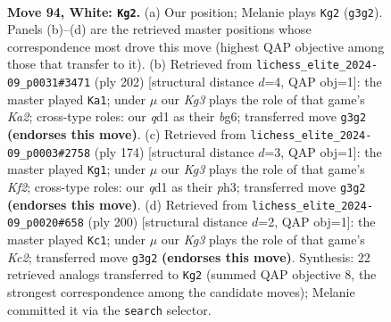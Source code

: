 \documentclass[11pt]{article}
\begin{document}
\clearpage

\begin{figure}[p]\centering
\begin{subfigure}{0.46\textwidth}\centering
\resizebox{\linewidth}{!}{%
\newchessgame
\chessboard[
  setfen={8/8/8/8/2p1k3/6K1/p7/3q4 w - - 0 94},
  showmover=false,
  pgfstyle=straightmove, color=movearrow, markmove={g3-g2}
]}
\caption{}
\end{subfigure}\hfill
\begin{subfigure}{0.46\textwidth}\centering
\resizebox{\linewidth}{!}{%
\newchessgame
\chessboard[
  setfen={8/8/p5b1/8/8/2k5/K7/8 w - - 14 102},
  showmover=false,
  pgfstyle=straightmove, color=movearrow, markmove={a2-a1}
]}
\caption{}
\end{subfigure}
\\[4pt]
\begin{subfigure}{0.46\textwidth}\centering
\resizebox{\linewidth}{!}{%
\newchessgame
\chessboard[
  setfen={8/8/8/7p/5k2/7p/5K2/8 w - - 12 88},
  showmover=false,
  pgfstyle=straightmove, color=movearrow, markmove={f2-g1}
]}
\caption{}
\end{subfigure}\hfill
\begin{subfigure}{0.46\textwidth}\centering
\resizebox{\linewidth}{!}{%
\newchessgame
\chessboard[
  setfen={8/8/8/7p/1q6/4k3/2K5/8 w - - 4 101},
  showmover=false,
  pgfstyle=straightmove, color=movearrow, markmove={c2-c1}
]}
\caption{}
\end{subfigure}
\caption{\textbf{Move 94, White: \texttt{Kg2}.} (a) Our position; Melanie plays \texttt{Kg2} (\texttt{g3g2}). Panels (b)--(d) are the retrieved master positions whose correspondence most drove this move (highest QAP objective among those that transfer to it). (b) Retrieved from \texttt{lichess\_elite\_2024-09\_p0031\#3471} (ply 202) [structural distance $d$=4, QAP obj=1]: the master played \texttt{Ka1}; under $\mu$ our \emph{Kg3} plays the role of that game's \emph{Ka2}; cross-type roles: our \emph{q}d1 as their \emph{b}g6; transferred move \texttt{g3g2} \textbf{(endorses this move)}. (c) Retrieved from \texttt{lichess\_elite\_2024-09\_p0003\#2758} (ply 174) [structural distance $d$=3, QAP obj=1]: the master played \texttt{Kg1}; under $\mu$ our \emph{Kg3} plays the role of that game's \emph{Kf2}; cross-type roles: our \emph{q}d1 as their \emph{p}h3; transferred move \texttt{g3g2} \textbf{(endorses this move)}. (d) Retrieved from \texttt{lichess\_elite\_2024-09\_p0020\#658} (ply 200) [structural distance $d$=2, QAP obj=1]: the master played \texttt{Kc1}; under $\mu$ our \emph{Kg3} plays the role of that game's \emph{Kc2}; transferred move \texttt{g3g2} \textbf{(endorses this move)}. Synthesis: 22 retrieved analogs transferred to \texttt{Kg2} (summed QAP objective 8, the strongest correspondence among the candidate moves); Melanie committed it via the \texttt{search} selector.}
\label{fig:thought-m186}
\end{figure}
\end{document}
